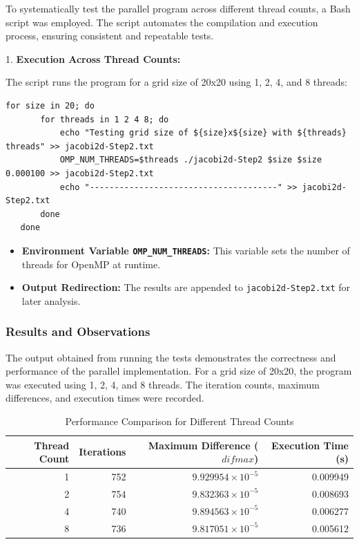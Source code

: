 \documentclass{article}
\begin{document}
To systematically test the parallel program across different thread counts, a Bash script was employed. The script automates the compilation and execution process, ensuring consistent and repeatable tests.

1. \textbf{Execution Across Thread Counts:}

   The script runs the program for a grid size of 20x20 using 1, 2, 4, and 8 threads:

   \begin{lstlisting}[style=CStyle, caption={}]
   for size in 20; do
       for threads in 1 2 4 8; do
           echo "Testing grid size of ${size}x${size} with ${threads} threads" >> jacobi2d-Step2.txt
           OMP_NUM_THREADS=$threads ./jacobi2d-Step2 $size $size 0.000100 >> jacobi2d-Step2.txt
           echo "--------------------------------------" >> jacobi2d-Step2.txt
       done
   done
   \end{lstlisting}

    \begin{itemize}
        \item \textbf{Environment Variable \texttt{OMP\_NUM\_THREADS}:} This variable sets the number of threads for OpenMP at runtime.
        \item \textbf{Output Redirection:} The results are appended to \texttt{jacobi2d-Step2.txt} for later analysis.
    \end{itemize}


\subsubsection{Results and Observations}

The output obtained from running the tests demonstrates the correctness and performance of the parallel implementation. For a grid size of 20x20, the program was executed using 1, 2, 4, and 8 threads. The iteration counts, maximum differences, and execution times were recorded.

\begin{table}[H]
    \centering
    \caption{Performance Comparison for Different Thread Counts}
    \label{tab:performance_comparison}
    \begin{tabular}{rrrr}
    \toprule
    \textbf{Thread Count} & \textbf{Iterations} & \textbf{Maximum Difference ($difmax$)} & \textbf{Execution Time (s)} \\
    \midrule
    1 & 752 & $9.929954 \times 10^{-5}$ & 0.009949 \\
    2 & 754 & $9.832363 \times 10^{-5}$ & 0.008693 \\
    4 & 740 & $9.894563 \times 10^{-5}$ & 0.006277 \\
    8 & 736 & $9.817051 \times 10^{-5}$ & 0.005612 \\
    \bottomrule
    \end{tabular}
\end{table}
\end{document}
